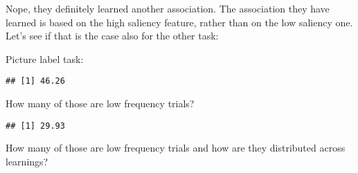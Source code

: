 \documentclass[
]{article}
\newenvironment{Shaded}{\begin{snugshade}}{\end{snugshade}}
\newcommand{\CommentTok}[1]{\textcolor[rgb]{0.56,0.35,0.01}{\textit{#1}}}
\newcommand{\DecValTok}[1]{\textcolor[rgb]{0.00,0.00,0.81}{#1}}
\newcommand{\KeywordTok}[1]{\textcolor[rgb]{0.13,0.29,0.53}{\textbf{#1}}}
\newcommand{\NormalTok}[1]{#1}
\newcommand{\OperatorTok}[1]{\textcolor[rgb]{0.81,0.36,0.00}{\textbf{#1}}}
\newcommand{\StringTok}[1]{\textcolor[rgb]{0.31,0.60,0.02}{#1}}
\begin{document}
Nope, they definitely learned another association. The association they
have learned is based on the high saliency feature, rather than on the
low saliency one. Let's see if that is the case also for the other task:

Picture label task:

\begin{Shaded}
\end{Shaded}

\begin{verbatim}
## [1] 46.26
\end{verbatim}

How many of those are low frequency trials?

\begin{Shaded}
\end{Shaded}

\begin{verbatim}
## [1] 29.93
\end{verbatim}

How many of those are low frequency trials and how are they distributed
across learnings?

\begin{Shaded}
\end{Shaded}
\end{document}
